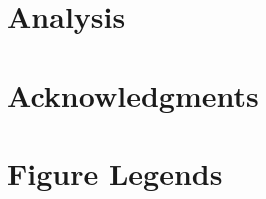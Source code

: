 \documentclass[10pt]{article}
\begin{document}
\section*{Analysis}

\section*{Acknowledgments}




\section*{Figure Legends}
\end{document}
